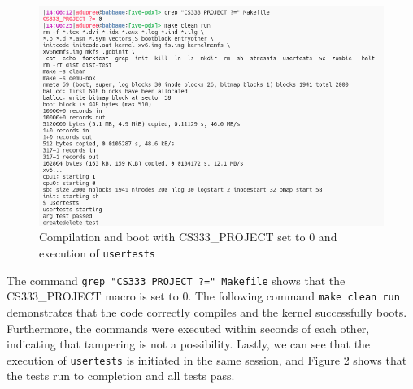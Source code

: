 \documentclass[11pt,letterpaper]{report}
\newcommand{\code}[1]{\colorbox{codegray}{\texttt{#1}}}
\begin{document}
{  \begin{figure}[h!]
	\centering
	\includegraphics[width=1\linewidth]{compilation1-usertests1.png}
	\caption[img]{Compilation and boot with CS333\_PROJECT set to 0 and execution of \code{usertests}}
	\label{fig:P1compileP0-1}
  \end{figure}

  The command \code{grep "CS333\_PROJECT ?=" Makefile} shows that the CS333\_PROJECT macro is set to 0.
  The following command \code{make clean run} demonstrates that the code correctly compiles and the kernel successfully boots. 
  Furthermore, the commands were executed within seconds of each other, indicating that
  tampering is not a possibility. Lastly, we can see that the execution of \code{usertests}
  is initiated in the same session, and Figure 2 shows that the tests run to completion and 
  all tests pass. \\

\ifdefined \LF
} %
\fi
\end{document}
